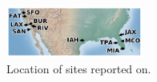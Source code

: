 \documentclass[10pt,a4paper,twocolumn]{article}
\begin{document}
% 
% 

\begin{figure}[ht!]
\centering
\includegraphics[width=0.4\textwidth]{figs/sitemap.pdf}
\caption{\label{fig:sitemap}Location of sites reported on.}
\end{figure}
\end{document}
